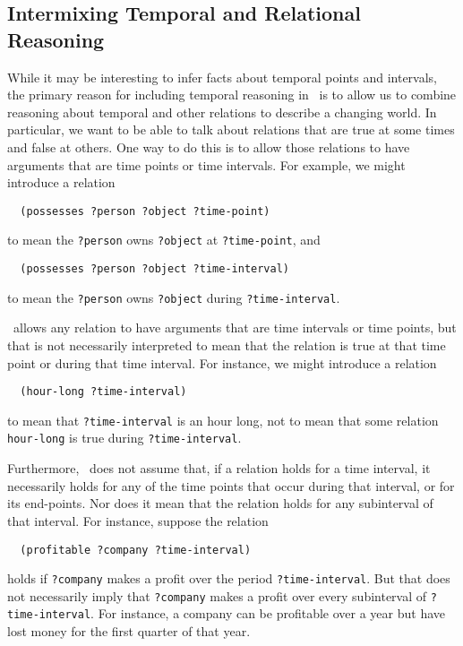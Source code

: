 \subsection{Intermixing Temporal and Relational Reasoning}
\label{subsec-temporal-relational}
While it may be interesting to infer facts about temporal points and
intervals, the primary reason for including temporal reasoning in \snark\  is
to allow us to combine reasoning about temporal and other relations to
describe a changing world. In particular, we want to be able to talk about
relations that are true at some times and false at others.  One way to do
this is to allow those relations to have arguments that are time points or
time intervals.  For example, we might introduce a relation
\begin{verbatim}
  (possesses ?person ?object ?time-point)
\end{verbatim}
to mean the \verb'?person' owns \verb'?object' at \verb'?time-point',
and
\begin{verbatim}
  (possesses ?person ?object ?time-interval)
\end{verbatim}
to mean the \verb'?person' owns \verb'?object' during \verb'?time-interval'.

\Snark\   allows any relation to have arguments that are
time intervals or time points, but that is not necessarily interpreted to
 mean that the relation is true at that time point or during that time
 interval.  For instance, we might introduce a relation
\begin{verbatim}
  (hour-long ?time-interval)
\end{verbatim}
to mean that {\tt ?time-interval} is an hour long, not to mean that some
relation {\tt hour-long} is true during {\tt ?time-interval}.

 Furthermore, \Snark\  does not assume that, if a relation holds for a time
interval, it necessarily holds for any of the time points that occur during
that interval, or for its end-points.  Nor does it mean that the relation
holds for any subinterval of that interval.
 For instance, suppose the relation
\begin{verbatim}
  (profitable ?company ?time-interval)
\end{verbatim}
holds if {\tt ?company} makes a profit over the period \verb'?time-interval'.
 But that does not necessarily imply that {\tt ?company} makes a profit over
 every subinterval of {\tt ?time-interval}.  For instance, a company can be
 profitable over a year but have lost money for the first quarter of that
 year.

